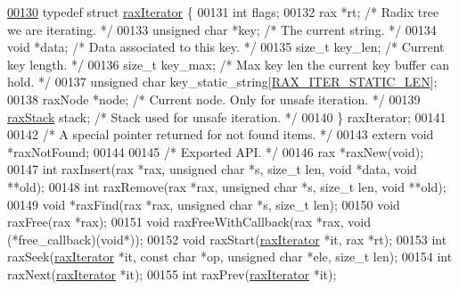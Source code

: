 \begin{DoxyCode}
\hyperlink{structraxIterator}{00130} \textcolor{keyword}{typedef} \textcolor{keyword}{struct} \hyperlink{structraxIterator}{raxIterator} \{
00131     \textcolor{keywordtype}{int} flags;
00132     rax *rt;                \textcolor{comment}{/* Radix tree we are iterating. */}
00133     \textcolor{keywordtype}{unsigned} \textcolor{keywordtype}{char} *key;     \textcolor{comment}{/* The current string. */}
00134     \textcolor{keywordtype}{void} *data;             \textcolor{comment}{/* Data associated to this key. */}
00135     size\_t key\_len;         \textcolor{comment}{/* Current key length. */}
00136     size\_t key\_max;         \textcolor{comment}{/* Max key len the current key buffer can hold. */}
00137     \textcolor{keywordtype}{unsigned} \textcolor{keywordtype}{char} key\_static\_string[\hyperlink{rax_8h_a172e740ce3572b21018192e7877217dd}{RAX\_ITER\_STATIC\_LEN}];
00138     raxNode *node;          \textcolor{comment}{/* Current node. Only for unsafe iteration. */}
00139     \hyperlink{structraxStack}{raxStack} stack;         \textcolor{comment}{/* Stack used for unsafe iteration. */}
00140 \} raxIterator;
00141 
00142 \textcolor{comment}{/* A special pointer returned for not found items. */}
00143 \textcolor{keyword}{extern} \textcolor{keywordtype}{void} *raxNotFound;
00144 
00145 \textcolor{comment}{/* Exported API. */}
00146 rax *raxNew(\textcolor{keywordtype}{void});
00147 \textcolor{keywordtype}{int} raxInsert(rax *rax, \textcolor{keywordtype}{unsigned} \textcolor{keywordtype}{char} *s, size\_t len, \textcolor{keywordtype}{void} *data, \textcolor{keywordtype}{void} **old);
00148 \textcolor{keywordtype}{int} raxRemove(rax *rax, \textcolor{keywordtype}{unsigned} \textcolor{keywordtype}{char} *s, size\_t len, \textcolor{keywordtype}{void} **old);
00149 \textcolor{keywordtype}{void} *raxFind(rax *rax, \textcolor{keywordtype}{unsigned} \textcolor{keywordtype}{char} *s, size\_t len);
00150 \textcolor{keywordtype}{void} raxFree(rax *rax);
00151 \textcolor{keywordtype}{void} raxFreeWithCallback(rax *rax, \textcolor{keywordtype}{void} (*free\_callback)(\textcolor{keywordtype}{void}*));
00152 \textcolor{keywordtype}{void} raxStart(\hyperlink{structraxIterator}{raxIterator} *it, rax *rt);
00153 \textcolor{keywordtype}{int} raxSeek(\hyperlink{structraxIterator}{raxIterator} *it, \textcolor{keyword}{const} \textcolor{keywordtype}{char} *op, \textcolor{keywordtype}{unsigned} \textcolor{keywordtype}{char} *ele, size\_t len);
00154 \textcolor{keywordtype}{int} raxNext(\hyperlink{structraxIterator}{raxIterator} *it);
00155 \textcolor{keywordtype}{int} raxPrev(\hyperlink{structraxIterator}{raxIterator} *it);

\end{DoxyCode}
